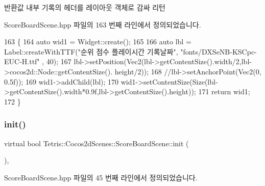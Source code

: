 \begin{DoxyReturn}{반환값}
내부 기록의 헤더를 레이아웃 객체로 감싸 리턴 
\end{DoxyReturn}


Score\+Board\+Scene.\+hpp 파일의 163 번째 라인에서 정의되었습니다.


\begin{DoxyCode}
163                                    \{
164                 \textcolor{keyword}{auto} wid1 = Widget::create();
165                
166                 \textcolor{keyword}{auto} lbl = Label::createWithTTF(\textcolor{stringliteral}{"순위   점수      플레이시간   기록날짜"}, \textcolor{stringliteral}{"fonts/DXSeNB-KSCpc-EUC-H.ttf"}
      , 40);
167                 lbl->setPosition(Vec2(lbl->getContentSize().width/2,lbl->cocos2d::Node::getContentSize().
      height/2));
168                 \textcolor{comment}{//lbl->setAnchorPoint(Vec2(0, 0.5f));}
169                  wid1->addChild(lbl);
170                 wid1->setContentSize(Size(lbl->getContentSize().width*0.9f,lbl->getContentSize().height));
171                 \textcolor{keywordflow}{return} wid1;
172             \}
\end{DoxyCode}
\mbox{\label{class_tetris_1_1_cocos2d_scenes_1_1_score_board_scene_a348c50d4213a4fee3888c216c16712ef}} 
\subsubsection{\texorpdfstring{init()}{init()}}
{\footnotesize\ttfamily virtual bool Tetris\+::\+Cocos2d\+Scenes\+::\+Score\+Board\+Scene\+::init (\begin{DoxyParamCaption}{ }\end{DoxyParamCaption})\hspace{0.3cm}{\ttfamily [inline]}, {\ttfamily [virtual]}}



Score\+Board\+Scene.\+hpp 파일의 45 번째 라인에서 정의되었습니다.


